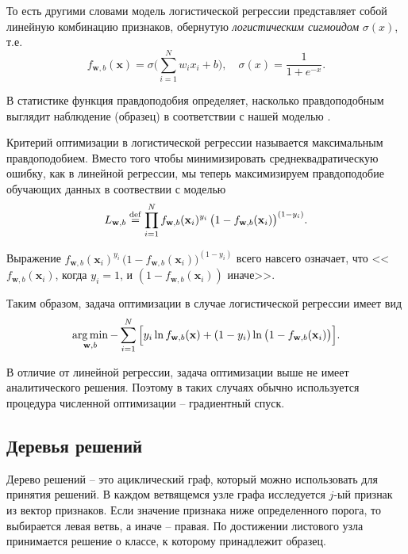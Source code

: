 \documentclass[%
	11pt,
	a4paper,
	utf8,
		]{article}
\begin{document}
То есть другими словами модель логистической регрессии представляет собой линейную комбинацию признаков, обернутую \emph{логистическим сигмоидом} $ \sigma(x) $, т.е.
$$
f_{ \mathbf{w}, b } (\mathbf{x}) = \sigma \Bigg( \sum_{i=1}^{N} w_i x_i + b \Bigg), \quad \sigma(x) = \dfrac{1}{ 1 + e^{-x} }.
$$


В статистике функция правдоподобия определяет, насколько правдоподобным выглядит наблюдение (образец) в соответствии с нашей моделью \cite[]{burkov:2020}.

Критерий оптимизации в логистической регрессии называется максимальным правдоподобием. Вместо того чтобы минимизировать среднеквадратическую ошибку, как в линейной регрессии, мы теперь максимизируем правдоподобие обучающих данных в соотвествии с моделью
\begin{align*}
	L_{ \mathbf{w}, b } \mathrel{ \stackrel{\rm def} = } \prod_{i=1}^{N} f_{ \mathbf{w}, b } (\mathbf{x}_i)^{y_i} \, \big( 1 - f_{ \mathbf{w},b } (\mathbf{x}_i) \big)^{ (1 - y_i) }.
\end{align*}

Выражение $ f_{ \mathbf{w}, b } (\mathbf{x}_i)^{y_i} \, \big( 1 - f_{ \mathbf{w},b } (\mathbf{x}_i) \big)^{ (1 - y_i) } $ всего навсего означает, что <<$ f_{ \mathbf{w}, b } (\mathbf{x}_i) $, когда $ y_i = 1 $, и $ (1 - f_{ \mathbf{w},b } (\mathbf{x}_i)) $ иначе>>.

Таким образом, задача оптимизации в случае логистической регрессии имеет вид
\begin{align*}
	\operatorname*{arg\,min}_{ \mathbf{w}, b } - \sum_{i=1}^N \Big[ y_i \ln f_{ \mathbf{w}, b } (\mathbf{x}) + (1 - y_i) \ln \big( 1 - f_{ \mathbf{w}, b } (\mathbf{x}_i) \big) \Big].
\end{align*}

В отличие от линейной регрессии, задача оптимизации выше не имеет аналитического решения. Поэтому в таких случаях обычно используется процедура численной оптимизации -- градиентный спуск.

\subsection{Деревья решений}

Дерево решений -- это ациклический граф, который можно использовать для принятия решений. В каждом ветвящемся узле графа исследуется $ j $-ый признак из вектор признаков. Если значение признака ниже определенного порога, то выбирается левая ветвь, а иначе -- правая. По достижении листового узла принимается решение о классе, к которому принадлежит образец.
\end{document}
